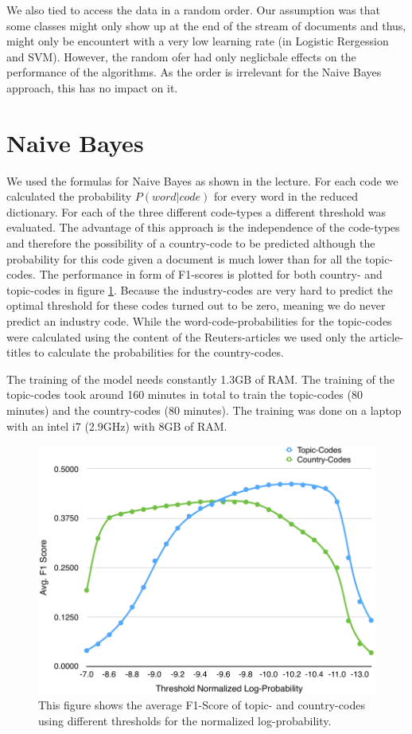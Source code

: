 \documentclass{article}
\begin{document}
We also tied to access the data in a random order. Our assumption was that some classes might only show up at the end of the stream of documents and thus, might only be encountert with a very low learning rate (in Logistic Rergession and SVM).
However, the random ofer had only neglicbale effects on the performance of the algorithms. As the order is irrelevant for the Naive Bayes approach, this has no impact on it.

\section*{Naive Bayes}
We used the formulas for Naive Bayes as shown in the lecture. For each code we calculated the probability $P(word | code)$ for every word in the reduced dictionary.
For each of the three different code-types a different threshold was evaluated. The advantage of this approach is the independence of the code-types and therefore the possibility of a country-code to be predicted although the probability for this code given a document is much lower than for all the topic-codes. The performance in form of F1-scores is plotted for both country- and topic-codes in figure \ref{fig_bayesThreshold}. Because the industry-codes are very hard to predict the optimal threshold for these codes turned out to be zero, meaning we do never predict an industry code.
While the word-code-probabilities for the topic-codes were calculated using the content of the Reuters-articles we used only the article-titles to calculate the probabilities for the country-codes. 

The training of the model needs constantly 1.3GB of RAM. The training of the topic-codes took around 160 minutes in total to train the topic-codes (80 minutes) and the country-codes (80 minutes). The training was done on a laptop with an intel i7 (2.9GHz) with 8GB of RAM.
\begin{figure}[h!]
    \centering
    \includegraphics[scale=0.6]{graphics/BayesF1ScoreTopicCountry.pdf}
    \caption{This figure shows the average F1-Score of topic- and country-codes using different thresholds for the normalized log-probability.}
    \label{fig_bayesThreshold}
\end{figure}
\end{document}
